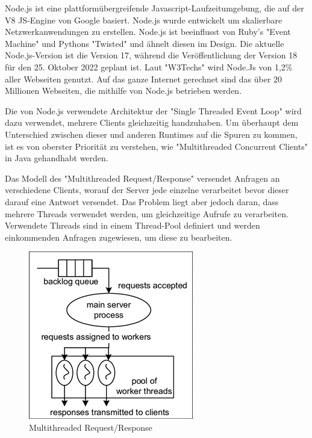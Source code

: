 \label{sec:nodejs}
Node.js ist eine plattformübergreifende Javascript-Laufzeitumgebung, die auf der V8 JS-Engine von Google basiert. Node.js wurde entwickelt um skalierbare Netzwerkanwendungen zu erstellen. Node.js ist beeinflusst von Ruby's "Event Machine" und Pythons "Twisted" und ähnelt diesen im Design. Die aktuelle Node.js-Version ist die Version 17, während die Veröffentlichung der Version 18 für den 25. Oktober 2022 geplant ist. Laut "W3Techs" wird Node.Js von 1,2\% aller Webseiten genutzt. Auf das ganze Internet gerechnet sind das über 20 Millionen Webseiten, die mithilfe von Node.js betrieben werden. \cite{Node}

Die von Node.js verwendete Architektur der "Single Threaded Event Loop" wird dazu verwendet, mehrere Clients gleichzeitig handzuhaben. Um überhaupt dem Unterschied zwischen dieser und anderen Runtimes auf die Spuren zu kommen, ist es von oberster Priorität zu verstehen, wie "Multithreaded Concurrent Clients" in Java gehandhabt werden. \cite{NodeJs.dev}


Das Modell des "Multithreaded Request/Response" versendet Anfragen an verschiedene Clients, worauf der Server jede einzelne verarbeitet bevor dieser darauf eine Antwort versendet. Das Problem liegt aber jedoch daran, dass mehrere Threads verwendet werden, um gleichzeitige Aufrufe zu verarbeiten. Verwendete Threads sind in einem Thread-Pool definiert und werden einkommenden Anfragen zugewiesen, um diese zu bearbeiten. \cite{Arocom}



\begin{figure}[H]
    \centering
    \includegraphics{media/NodeJs/MultiThreadedRequestResponse.png}
    \caption{Multithreaded Request/Response\cite{Multithreaded}}
\end{figure}

